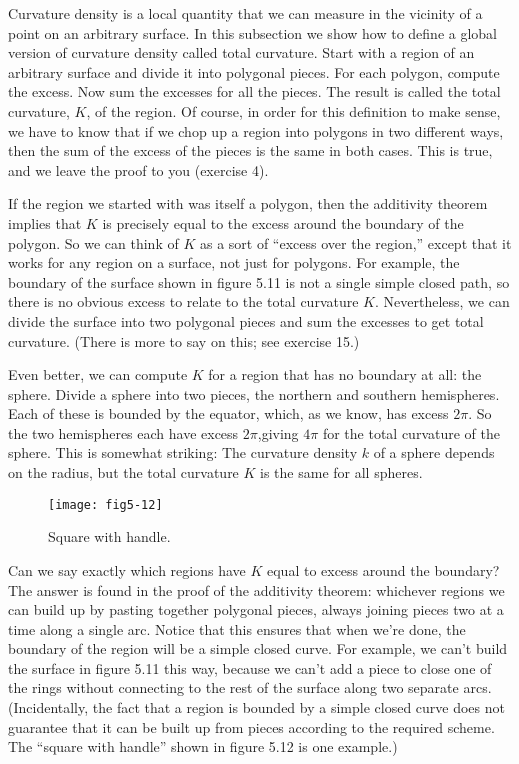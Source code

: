 \documentclass{book}
\begin{document}
Curvature density is a local quantity that we can measure in the vicinity
of a point on an arbitrary surface. In this subsection we show how to
define a global version of curvature density called total curvature. Start
with a region of an arbitrary surface and divide it into polygonal pieces.
For each polygon, compute the excess. Now sum the excesses for all the
pieces. The result is called the total curvature, $K$, of the region. Of
course, in order for this definition to make sense, we have to know that
if we chop up a region into polygons in two different ways, then the sum
of the excess of the pieces is the same in both cases. This is true, and
we leave the proof to you (exercise 4).

If the region we started with was itself a polygon, then the additivity
theorem implies that $K$ is precisely equal to the excess around the
boundary of the polygon. So we can think of $K$ as a sort of ``excess
over the region,'' except that it works for any region on a surface, not
just for polygons. For example, the boundary of the surface shown in
figure 5.11 is not a single simple closed path, so there is no obvious
excess to relate to the total curvature $K$. Nevertheless, we can divide
the surface into two polygonal pieces and sum the excesses to get total
curvature. (There is more to say on this; see exercise 15.)

Even better, we can compute $K$ for a region that has no boundary
at all: the sphere. Divide a sphere into two pieces, the northern and
southern hemispheres. Each of these is bounded by the equator, which,
as we know, has excess $2 \pi$. So the two hemispheres each have excess
$2 \pi$,giving $4 \pi$ for the total curvature of the sphere. This is somewhat
striking: The curvature density $k$ of a sphere depends on the radius, but
the total curvature $K$ is the same for all spheres.

\begin{figure}
\begin{center}
\texttt{[image: fig5-12]}
\caption{Square with handle.}
\end{center}
\end{figure}

Can we say exactly which regions have $K$ equal to excess around the
boundary? The answer is found in the proof of the additivity theorem:
whichever regions we can build up by pasting together polygonal pieces,
always joining pieces two at a time along a single arc. Notice that this
ensures that when we're done, the boundary of the region will be a
simple closed curve. For example, we can't build the surface in figure
5.11 this way, because we can't add a piece to close one of the rings
without connecting to the rest of the surface along two separate arcs.
(Incidentally, the fact that a region is bounded by a simple closed curve
does not guarantee that it can be built up from pieces according to the
required scheme. The ``square with handle'' shown in figure 5.12 is one
example.)
\end{document}
